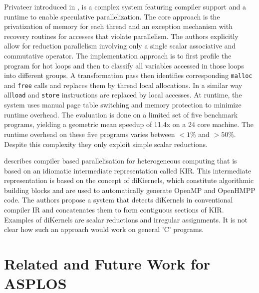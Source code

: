     Privateer introduced in \cite{Johnson:2012:SSP:2254064.2254107}, is a
    complex system featuring compiler support and a runtime to enable
    speculative parallelization.
    The core approach is the privatization of memory for each thread and an
    exception mechanism with recovery routines for accesses that violate
    parallelism.
    The authors explicitly allow for reduction parallelism involving only a
    single scalar associative and commutative operator.
    The implementation approach is to first profile the program for hot loops
    and then to classify all variables accessed in those loops into different
    groups.
    A transformation pass then identifies corresponding \texttt{malloc} and
    \texttt{free} calls and replaces them by thread local allocations.
    In a similar way all\texttt{load} and \texttt{store} instructions are
    replaced by local accesses.
    At runtime, the system uses manual page table switching and memory
    protection to minimize runtime overhead.
    The evaluation is done on a limited set of five benchmark programs, yielding
    a geometric mean speedup of 11.4x on a 24 core machine.
    The runtime overhead on these five programs varies between $<1\%$ and
    $>50\%$.
    Despite this complexity they only exploit simple scalar reductions.

    \citet{Andion2015Compilation} describes compiler based
    parallelisation for heterogeneous computing that is based on
    an idiomatic intermediate representation called KIR.
    This intermediate representation is based on the concept of
    \mbox{diKiernels}, which constitute algorithmic building blocks and are used
    to automatically generate OpenMP and OpenHMPP code.
    The authors propose a system that detects diKernels in conventional compiler
    IR and concatenates them to form contiguous sections of KIR.
    Examples of diKernels are scalar reductions and irregular
    assignments.
    It is not clear how such an approach would work on general 'C' programs.


\section{Related and Future Work for ASPLOS}

